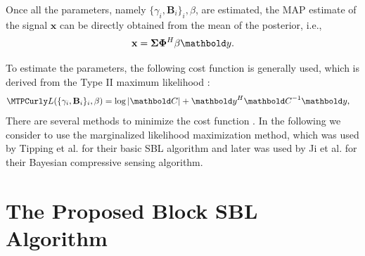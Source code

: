 Once all the parameters, namely $\{\gamma_i,\mathbf{B}_i\}_i,\beta$,  are estimated, the MAP estimate of the signal $\mathbf{x}$ can be directly obtained from the mean of the posterior, i.e.,
\begin{equation}
\mathbf{x} = \bm{\Sigma}\bm{\Phi}^H\beta\ve{y}. \label{eq:Rule_x}
\end{equation}

To estimate the parameters,  the following cost function is generally used, which is derived from the Type II maximum likelihood \cite{Zhang2012a}:
\begin{align}
\mathcal{L}(\{\gamma_i,\mathbf{B}_i\}_i,\beta)
 &= \log\abs{\ve{C}} + \ve{y}^H\ve{C}^{-1}\ve{y}, \label{eq:loglikelihood}
\end{align}
There are several methods to minimize the cost function \cite{Zhang2012a}. In the following we consider to use the marginalized likelihood maximization method, which was used by Tipping et al. \cite{Faul2002} for their basic SBL algorithm and later was used by Ji et al. \cite{Ji2008} for their Bayesian compressive sensing algorithm.

\section{The Proposed Block SBL Algorithm}

